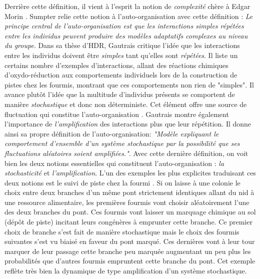Derrière cette définition, il vient à l'esprit la notion de \textit{complexité} chère à Edgar Morin \cite{morin_methode_1977}. Sumpter \cite{sumpter_principles_2006} relie cette notion à l'auto-organisation avec cette définition : \textit{Le principe central de l'auto-organisation est que les interactions simples répétées entre les individus peuvent produire des modèles adaptatifs complexes au niveau du groupe}\footnotemark[2].  
Dans sa thèse d'HDR, Gautrais \cite{gautrais_dynamiques_2015} critique l'idée que les interactions entre les individus doivent être \textit{simples} tant qu'elles sont \textit{répétées}. Il liste un certains nombre d'exemples d'interactions, allant des réactions chimiques d'oxydo-réduction aux comportements individuels lors de la construction de pistes chez les fourmis, montrant que ces comportements non rien de "simples". Il avance plutôt l'idée que la multitude d'individus présents se comportent de manière \textit{stochastique} et donc non déterministe. Cet élément offre une source de fluctuation qui constitue l'auto-organisation \cite{gautrais_dynamiques_2015}. Gautrais \cite{gautrais_dynamiques_2015} montre également l'importance de \textit{l'amplification} des interactions plus que leur répétition. Il donne ainsi sa propre définition de l'auto-organisation: \textit{"Modèle expliquant le comportement d’ensemble d’un système stochastique par la possibilité que ses fluctuations aléatoires soient amplifiées."}\cite{gautrais_dynamiques_2015}.
Avec cette dernière définition, on voit bien les deux notions essentielles qui constituent l'auto-organisation : \textit{la stochasticité} et \textit{l'amplification}.
L'un des exemples les plus explicites traduisant ces deux notions est le suivi de piste chez la fourmi \cite{deneubourg_collective_1989}. Si on laisse à une colonie le choix entre deux branches d'un même pont strictement identiques allant du nid à une ressource alimentaire, les premières fourmis vont choisir aléatoirement l'une des deux branches du pont. Ces fourmis vont laisser un marquage chimique au sol (dépôt de piste) incitant leurs congénères à emprunter cette branche. Ce premier choix de branche s'est fait de manière stochastique mais le choix des fourmis suivantes s'est vu biaisé en faveur du pont marqué. Ces dernières vont à leur tour marquer de leur passage cette branche peu marquée augmentant un peu plus les probabilités que d'autres fourmis empruntent cette branche du pont. Cet exemple reflète très bien la dynamique de type amplification d'un système stochastique.

